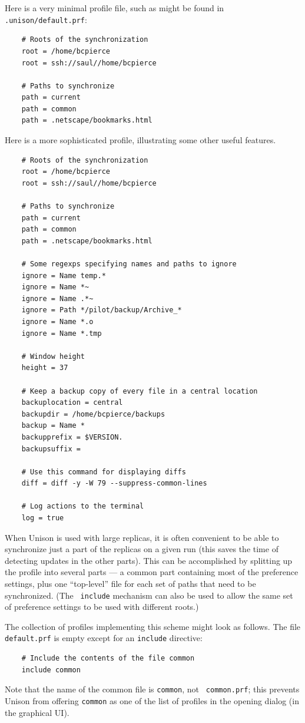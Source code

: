 \documentclass{article}
\begin{document}

Here is a very minimal profile file, such as might be found in {\tt
  .unison/default.prf}:
\begin{verbatim}
    # Roots of the synchronization
    root = /home/bcpierce
    root = ssh://saul//home/bcpierce

    # Paths to synchronize
    path = current
    path = common
    path = .netscape/bookmarks.html
\end{verbatim}


Here is a more sophisticated profile, illustrating some other useful
features.
\begin{verbatim}
    # Roots of the synchronization
    root = /home/bcpierce
    root = ssh://saul//home/bcpierce

    # Paths to synchronize
    path = current
    path = common
    path = .netscape/bookmarks.html

    # Some regexps specifying names and paths to ignore
    ignore = Name temp.*
    ignore = Name *~
    ignore = Name .*~
    ignore = Path */pilot/backup/Archive_*
    ignore = Name *.o
    ignore = Name *.tmp

    # Window height
    height = 37

    # Keep a backup copy of every file in a central location
    backuplocation = central
    backupdir = /home/bcpierce/backups
    backup = Name *
    backupprefix = $VERSION.
    backupsuffix =

    # Use this command for displaying diffs
    diff = diff -y -W 79 --suppress-common-lines

    # Log actions to the terminal
    log = true
\end{verbatim}


When Unison is used with large replicas, it is often convenient to be
able to synchronize just a part of the replicas on a given run (this
saves the time of detecting updates in the other parts).  This can be
accomplished by splitting up the profile into several parts --- a common
part containing most of the preference settings, plus one ``top-level''
file for each set of paths that need to be synchronized.  (The {\tt
  include} mechanism can also be used to allow the same set of preference
settings to be used with different roots.)

The collection
of profiles implementing this scheme might look as follows.
%
The file {\tt default.prf} is empty except for an {\tt include}
directive:
\begin{verbatim}
    # Include the contents of the file common
    include common
\end{verbatim}
Note that the name of the common file is {\tt common}, not {\tt
  common.prf}; this prevents Unison from offering {\tt common} as one of
the list of profiles in the opening dialog (in the graphical UI).
\end{document}
